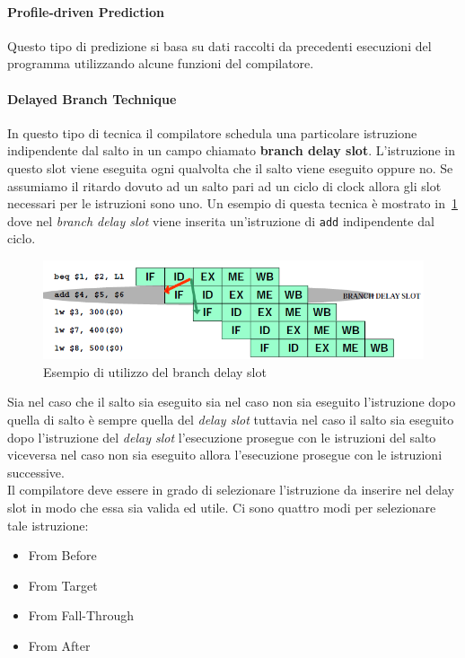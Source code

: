 \paragraph{Profile-driven Prediction}
Questo tipo di predizione si basa su dati raccolti da precedenti esecuzioni del programma utilizzando alcune funzioni del compilatore.
\paragraph{Delayed Branch Technique}
In questo tipo di tecnica il compilatore schedula una particolare istruzione indipendente dal salto in un campo chiamato \textbf{branch delay slot}. L'istruzione in questo slot viene eseguita ogni qualvolta che  il salto viene eseguito oppure no. Se assumiamo il ritardo dovuto ad un salto pari ad un ciclo di clock allora gli slot necessari per le istruzioni sono uno.
Un esempio di questa tecnica è mostrato in \figurename\,\ref{fig:branchdelay} dove nel \emph{branch delay slot} viene inserita un'istruzione di \texttt{add} indipendente dal ciclo.
\begin{figure}[htb]
\centering
\includegraphics[scale=0.5]{img/branchdelay.png}
\caption{Esempio di utilizzo del branch delay slot}\label{fig:branchdelay}
\end{figure}
Sia nel caso che il salto sia eseguito sia nel caso non sia eseguito l'istruzione dopo quella di salto è sempre quella del \emph{delay slot} tuttavia nel caso il salto sia eseguito dopo l'istruzione del \emph{delay slot} l'esecuzione prosegue con le istruzioni del salto viceversa nel caso non sia eseguito allora l'esecuzione prosegue con le istruzioni successive.\\
Il compilatore deve essere in grado di selezionare l'istruzione da inserire nel delay slot in modo che essa sia valida ed utile. Ci sono quattro modi per selezionare tale istruzione:
\begin{itemize}
\item From Before
\item From Target
\item From Fall-Through
\item From After
\end{itemize}
